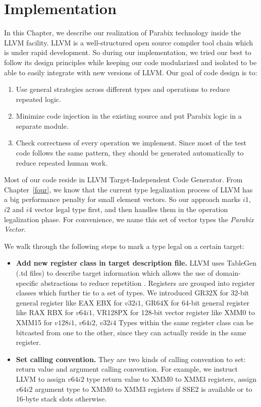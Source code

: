 %
%

\chapter{Implementation}
\label{five}

In this Chapter, we describe our realization of Parabix technology inside the LLVM facility. LLVM is a well-structured open source compiler tool chain which is under rapid development. So during our implementation, we tried our best to follow its design principles while keeping our code modularized and isolated to be able to easily integrate with new versions of LLVM\@. Our goal of code design is to:
\begin{enumerate}
  \item Use general strategies across different types and operations to reduce repeated logic.
  \item Minimize code injection in the existing source and put Parabix logic in a separate module.
  \item Check correctness of every operation we implement. Since most of the test code follows the same pattern, they should be generated automatically to reduce repeated human work.
\end{enumerate}

Most of our code reside in LLVM Target-Independent Code Generator\cite{llvm_code_gen}. From Chapter~\ref{four}, we know that the current type legalization process of LLVM has a big performance penalty for small element vectors. So our approach marks $i1$, $i2$ and $i4$ vector legal type first, and then handles them in the operation legalization phase. For convenience, we name this set of vector types the \textit{Parabix Vector}.

We walk through the following steps to mark a type legal on a certain target:
\begin{itemize}
  \item \textbf{Add new register class in target description file.} LLVM uses TableGen (.td files) to describe target information which allows the use of domain-specific abstractions to reduce repetition \cite{llvm_code_gen}. Registers are grouped into register classes which further tie to a set of types. We introduced GR32X for 32-bit general register like EAX EBX for $v32i1$, GR64X for 64-bit general register like RAX RBX for $v64i1$, VR128PX for 128-bit vector register like XMM0 to XMM15 for $v128i1$, $v64i2$, $v32i4$  Types within the same register class can be bitcasted from one to the other, since they can actually reside in the same register.

  \item \textbf{Set calling convention.} They are two kinds of calling convention to set: return value and argument calling convention. For example, we instruct LLVM to assign $v64i2$ type return value to XMM0 to XMM3 registers, assign $v64i2$ argument type to XMM0 to XMM3 registers if SSE2 is available or to 16-byte stack slots otherwise.
\end{itemize}

